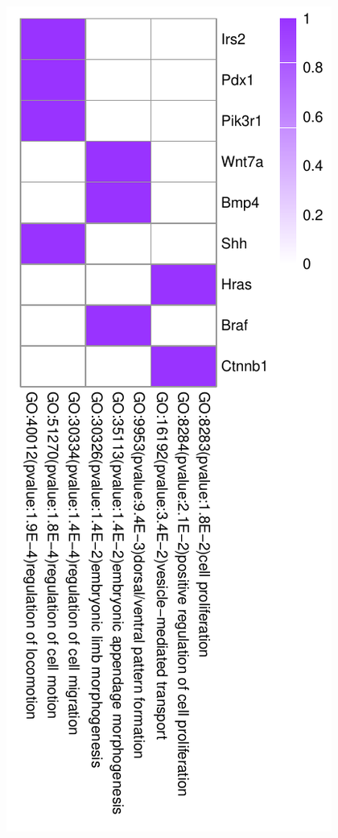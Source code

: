 \documentclass{bmcart}
\begin{document}
\begin{figure}[!h]
  \hfil
  \begin{minipage}{.30\linewidth}
   \includegraphics[width=\linewidth]{DrawPictures/v20.pdf}

\end{minipage}
\end{figure}
\end{document}
